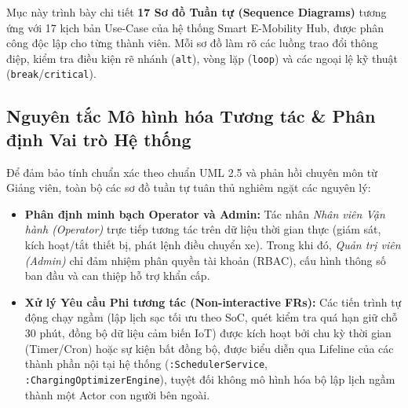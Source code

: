 \documentclass[12pt,a4paper]{article}
\begin{document}
Mục này trình bày chi tiết \textbf{17 Sơ đồ Tuần tự (Sequence Diagrams)} tương ứng với 17 kịch bản Use-Case của hệ thống Smart E-Mobility Hub, được phân công độc lập cho từng thành viên. Mỗi sơ đồ làm rõ các luồng trao đổi thông điệp, kiểm tra điều kiện rẽ nhánh (\texttt{alt}), vòng lặp (\texttt{loop}) và các ngoại lệ kỹ thuật (\texttt{break}/\texttt{critical}).

\subsection*{Nguyên tắc Mô hình hóa Tương tác \& Phân định Vai trò Hệ thống}
Để đảm bảo tính chuẩn xác theo chuẩn UML 2.5 và phản hồi chuyên môn từ Giảng viên, toàn bộ các sơ đồ tuần tự tuân thủ nghiêm ngặt các nguyên lý:
\begin{itemize}[nosep]
    \item \textbf{Phân định minh bạch Operator và Admin:} Tác nhân \textit{Nhân viên Vận hành (Operator)} trực tiếp tương tác trên dữ liệu thời gian thực (giám sát, kích hoạt/tắt thiết bị, phát lệnh điều chuyển xe). Trong khi đó, \textit{Quản trị viên (Admin)} chỉ đảm nhiệm phân quyền tài khoản (RBAC), cấu hình thông số ban đầu và can thiệp hỗ trợ khẩn cấp.
    \item \textbf{Xử lý Yêu cầu Phi tương tác (Non-interactive FRs):} Các tiến trình tự động chạy ngầm (lập lịch sạc tối ưu theo SoC, quét kiểm tra quá hạn giữ chỗ 30 phút, đồng bộ dữ liệu cảm biến IoT) được kích hoạt bởi chu kỳ thời gian (Timer/Cron) hoặc sự kiện bất đồng bộ, được biểu diễn qua Lifeline của các thành phần nội tại hệ thống (\texttt{:SchedulerService}, \texttt{:ChargingOptimizerEngine}), tuyệt đối không mô hình hóa bộ lập lịch ngầm thành một Actor con người bên ngoài.
\end{itemize}
\end{document}
